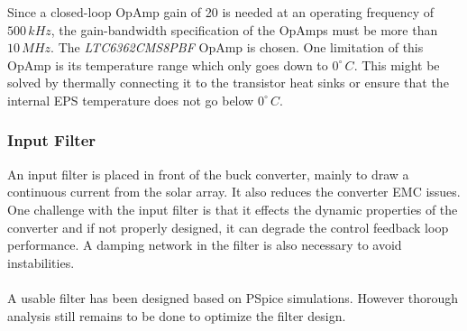 Since a closed-loop OpAmp gain of 20 is needed at an operating frequency of $500\,kHz$, the gain-bandwidth specification of the OpAmps must be more than $10\,MHz$. The \textit{LTC6362CMS8PBF} OpAmp is chosen. One limitation of this OpAmp is its temperature range which only goes down to $0^{\circ}\,C$. This might be solved by thermally connecting it to the transistor heat sinks or ensure that the internal \ac{EPS} temperature does not go below $0^{\circ}\,C$.
%
\subsubsection*{Input Filter}
An input filter is placed in front of the buck converter, mainly to draw a continuous current from the solar array. It also reduces the converter \ac{EMC} issues. 
One challenge with the input filter is that it effects the dynamic properties of the converter and if not properly designed, it can degrade the control feedback loop performance. A damping network in the filter is also necessary to avoid instabilities\cite[sec. 10-3]{Fundamentals}.
\\
\\
A usable filter has been designed based on PSpice simulations. However thorough analysis still remains to be done to optimize the filter design.
%
%
